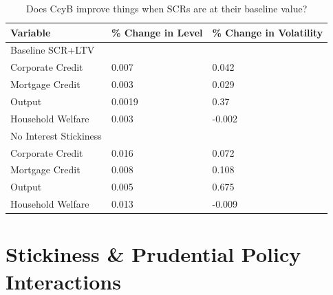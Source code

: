 \documentclass[12pt]{article}
\numberwithin{equation}{section}
\begin{document}
\begin{table}[h]
\caption{Does CcyB improve things when SCRs are at their baseline value? }
\begin{tabular}{l|l|l}
\small
Variable & \% Change in Level & \% Change in Volatility \\
\hline
Baseline SCR+LTV & & \\
\hline
    Corporate Credit           &       0.007    &      0.042 \\
    Mortgage Credit            &      0.003    &       0.029 \\
    Output         &     0.0019    &    0.37 \\ 
    Household Welfare       &     0.003     &     -0.002\\
  
 \hline
No Interest Stickiness & & \\
\hline

    Corporate Credit           &       0.016    &      0.072 \\
    Mortgage Credit            &      0.008    &       0.108 \\
    Output         &     0.005    &    0.675 \\ 
    Household Welfare       &     0.013     &     -0.009\\
  \end{tabular}
\end{table}



\newpage


\section*{Stickiness \& Prudential Policy Interactions}



\begin{figure}[h]
\end{figure}
\end{document}
